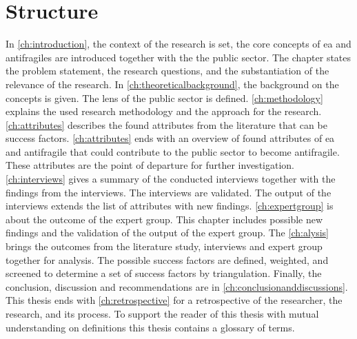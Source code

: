 \section{Structure}
\label{sec:structure}
In \cref{ch:introduction}, the context of the research is set, the core concepts of \acrshort{ea} and \glspl{antifragile} are introduced together with the the public sector. The chapter states the problem statement, the research questions, and the substantiation of the relevance of the research. In \cref{ch:theoreticalbackground}, the background on the concepts is given. The lens of the public sector is defined. \cref{ch:methodology} explains the used research methodology and the approach for the research. \cref{ch:attributes} describes the found attributes from the literature that can be success factors. \cref{ch:attributes} ends with an overview of found attributes of \acrshort{ea} and \gls{antifragile} that could contribute to the public sector to become \gls{antifragile}. These attributes are the point of departure for further investigation. \cref{ch:interviews} gives a summary of the conducted interviews together with the findings from the interviews. The interviews are validated. The output of the interviews extends the list of attributes with new findings. \cref{ch:expertgroup} is about the outcome of the expert group. This chapter includes possible new findings and the validation of the output of the expert group. The \cref{ch:alysis} brings the outcomes from the literature study, interviews and expert group together for analysis. The possible success factors are defined, weighted, and screened to determine a set of success factors by triangulation. Finally, the conclusion, discussion and recommendations are in \cref{ch:conclusionanddiscussions}. This thesis ends with \cref{ch:retrospective} for a retrospective of the researcher, the research, and its process. To support the reader of this thesis with mutual understanding on definitions this thesis contains a glossary of terms.
